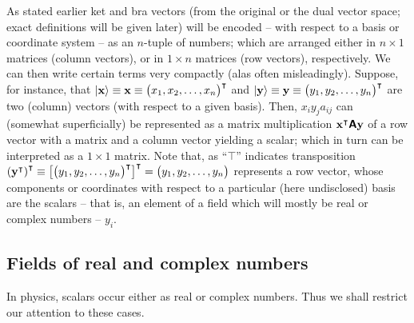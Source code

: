 As stated earlier ket and bra vectors (from the original or the dual vector space; exact definitions will be given later)
will be encoded -- with respect to a basis or coordinate system -- as an $n$-tuple of numbers;
which are arranged either in $n \times 1$ matrices (column vectors),
or in $1 \times n$ matrices (row vectors), respectively.
We can then write certain terms very compactly (alas often misleadingly).
Suppose, for instance, that
$\vert {\bf x} \rangle \equiv {\bf x}\equiv \begin{pmatrix}x_1, x_2,\ldots ,x_n\end{pmatrix}^\intercal $
and
$\vert {\bf y} \rangle \equiv {\bf y}\equiv \begin{pmatrix}y_1, y_2,\ldots ,y_n\end{pmatrix}^\intercal $
are two (column) vectors (with respect to a given basis).
Then, $x_iy_j a_{ij}$ can (somewhat superficially) be represented as a matrix multiplication ${\bf x}^\intercal  \textsf{\textbf{A}} {\bf y}$ of
a row vector with a matrix and a column vector  yielding a scalar; which in turn can be interpreted as a $1 \times 1$ matrix.
Note that, as ``$\intercal$'' indicates transposition
$\left({\bf y}^\intercal \right)^\intercal \equiv \left[ \begin{pmatrix}
y_1,
y_2,
\ldots ,
y_n
\end{pmatrix}^\intercal \right]^\intercal
=
\begin{pmatrix}
y_1,
y_2,
\ldots ,
y_n
\end{pmatrix}
$
represents a row vector, whose components or coordinates with respect to a particular (here undisclosed) basis are the scalars -- that is, an element of a field which will mostly be real or complex numbers -- $y_i$.

\subsection{Fields of real and complex numbers}
\label{2017-m-ch-fdvs-fields}

In physics, scalars occur either as real or complex numbers.
Thus we shall restrict our attention to these cases.

